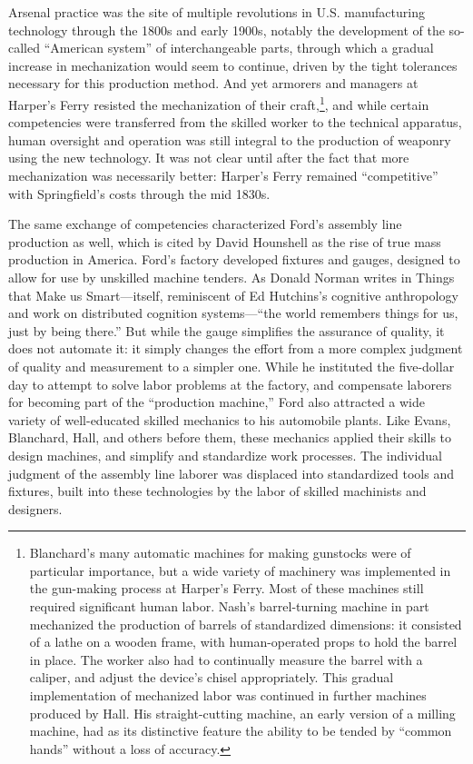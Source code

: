 Arsenal practice was the site of multiple revolutions in U.S.
manufacturing technology through the 1800s and early 1900s, notably
the development of the so-called “American system” of interchangeable
parts, through which a gradual increase in mechanization would seem to
continue, driven by the tight tolerances necessary for this production
method. And yet armorers and managers at Harper's Ferry resisted the
mechanization of their craft,\footnote{Blanchard's many automatic
  machines for making gunstocks were of particular
  importance,\cite[p. 56]{roesmithHarpers} but a wide variety of machinery
  was implemented in the gun-making process at Harper's Ferry. Most of
 these machines still required significant human labor. Nash's
 barrel-turning machine in part mechanized the production of barrels
 of standardized dimensions: it consisted of a lathe on a wooden
 frame, with human-operated props to hold the barrel in
 place.\cite[p. 119]{roesmithHarpers} The worker also had to continually
 measure the barrel with a caliper, and adjust the device's chisel
 appropriately.\cite[p. 121]{roesmithHarpers} This gradual implementation of
 mechanized labor was continued in further machines produced by Hall.
 His straight-cutting machine, an early version of a milling machine,
 had as its distinctive feature the ability to be tended by ``common
 hands'' without a loss of
accuracy.\cite[p. 239]{roesmithHarpers}}, and while certain competencies were
transferred from the skilled worker
to the technical apparatus, human oversight and operation was still
integral to the production of weaponry using the new technology. It was
not clear until after the fact that more mechanization was necessarily
better: Harper's Ferry remained ``competitive'' with Springfield's
costs through the mid 1830s.\cite[p. 324]{roesmithHarpers}

The same exchange of competencies characterized Ford's assembly line
production as well, which is cited by David Hounshell as the rise of
true mass production in America.\cite[p. 217]{hounshell} Ford's factory developed fixtures
and gauges, designed to allow for use by unskilled machine tenders. As Donald
Norman writes in Things that Make us Smart---itself, reminiscent of Ed
Hutchins's cognitive anthropology and work on distributed cognition
systems---``the world remembers things for us, just by being
there.''\cite[p. 147]{normanThings} But while the gauge simplifies the
assurance  of quality, it does not
automate it: it simply changes the effort from a more complex judgment
of quality and measurement to a simpler one. While he instituted the
five-dollar day to attempt to solve labor problems at the factory, and
compensate laborers for becoming part of the ``production machine,''
Ford also attracted a wide variety of well-educated skilled mechanics
to his automobile plants.\cite[p. 223]{hounshell} Like Evans, Blanchard, Hall, and others
before them, these mechanics applied their skills to design machines,
and simplify and standardize work processes. The individual judgment
of the assembly line laborer was displaced into standardized tools and
fixtures, built into these technologies by the labor of skilled
machinists and designers.


